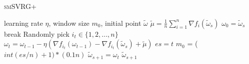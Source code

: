 \documentclass[conference]{IEEEtran}
\begin{document}
 \begin{algorithm}
 	\caption{\textsc{smSVRG+}}
	\label{smSVRG+}
	\begin{algorithmic}[1]
	\Require learning rate $\eta$, window size $m_0$, initial point $\tilde{\omega}$
		\State $\tilde{\mu} = \frac{1}{n}\sum\limits_{i=1}^{n}\nabla f_{i}(\tilde{\omega}_{s})$
		\State $\omega_0 = \tilde{\omega}_s$
			\State break
			\EndIf
			\State Randomly pick $i_t\in\{1, 2, ..., n\}$
			\State $\omega_t = \omega_{t-1} - \eta(\nabla f_{i_t}(\omega_{t-1}) - \nabla f_{i_t}(\tilde{\omega}_s)+\tilde{\mu})$
		\EndFor
		\State $es = t$	
		\State $m_0$ = ($int(es/n)+1) * (0.1n)$
		\State $\tilde{\omega}_{s+1} = \omega_{t}$
	\EndFor
	\State \Return $\tilde{\omega}_{s+1}$
	\end{algorithmic}
\end{algorithm}
 
\end{document}
